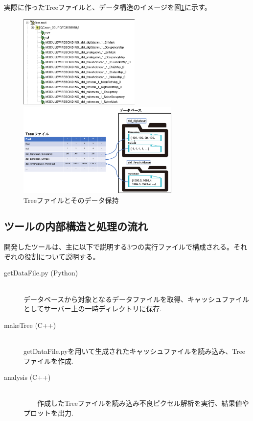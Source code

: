 実際に作ったTreeファイルと、データ構造のイメージを図\ref{analysis_tool_tree}に示す。

\begin{figure}[bpt]
  \begin{center}
  \begin{minipage}{0.4\hsize}
    \includegraphics[width=6cm]{analysis_tool_tree_file}
  \end{minipage}
  \begin{minipage}{0.4\hsize}
    \includegraphics[width=8cm]{analysis_tool_tree_image}
  \end{minipage}
  \caption[Treeファイルとそのデータ保持]{Treeファイルとそのデータ保持}
  \label{analysis_tool_tree}
  \end{center}
\end{figure}

\clearpage
\subsection{ツールの内部構造と処理の流れ}
開発したツールは、主に以下で説明する3つの実行ファイルで構成される。それぞれの役割について説明する。

\begin{description}
  \item[getDataFile.py (Python)]\mbox{}\\ 
    データベースから対象となるデータファイルを取得、キャッシュファイルとしてサーバー上の一時ディレクトリに保存.
  \item[makeTree (C++)]\mbox{}\\ 
    getDataFile.pyを用いて生成されたキャッシュファイルを読み込み、Treeファイルを作成.
  \item[analysis (C++)]\mbox{}\\ 
　　作成したTreeファイルを読み込み不良ピクセル解析を実行、結果値やプロットを出力.
\end{description}

